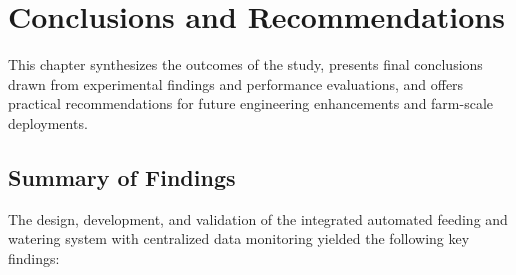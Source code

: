 
\chapter{Conclusions and Recommendations}

This chapter synthesizes the outcomes of the study, presents final conclusions drawn from experimental findings and performance evaluations, and offers practical recommendations for future engineering enhancements and farm-scale deployments.

\section{Summary of Findings}

The design, development, and validation of the integrated automated feeding and watering system with centralized data monitoring yielded the following key findings:

